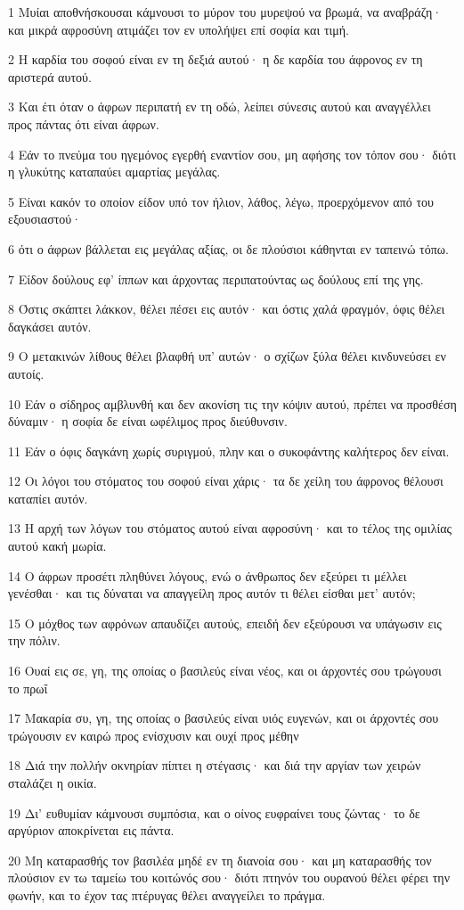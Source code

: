 \par 1 Μυίαι αποθνήσκουσαι κάμνουσι το μύρον του μυρεψού να βρωμά, να αναβράζη· και μικρά αφροσύνη ατιμάζει τον εν υπολήψει επί σοφία και τιμή.
\par 2 Η καρδία του σοφού είναι εν τη δεξιά αυτού· η δε καρδία του άφρονος εν τη αριστερά αυτού.
\par 3 Και έτι όταν ο άφρων περιπατή εν τη οδώ, λείπει σύνεσις αυτού και αναγγέλλει προς πάντας ότι είναι άφρων.
\par 4 Εάν το πνεύμα του ηγεμόνος εγερθή εναντίον σου, μη αφήσης τον τόπον σου· διότι η γλυκύτης καταπαύει αμαρτίας μεγάλας.
\par 5 Είναι κακόν το οποίον είδον υπό τον ήλιον, λάθος, λέγω, προερχόμενον από του εξουσιαστού·
\par 6 ότι ο άφρων βάλλεται εις μεγάλας αξίας, οι δε πλούσιοι κάθηνται εν ταπεινώ τόπω.
\par 7 Είδον δούλους εφ' ίππων και άρχοντας περιπατούντας ως δούλους επί της γης.
\par 8 Όστις σκάπτει λάκκον, θέλει πέσει εις αυτόν· και όστις χαλά φραγμόν, όφις θέλει δαγκάσει αυτόν.
\par 9 Ο μετακινών λίθους θέλει βλαφθή υπ' αυτών· ο σχίζων ξύλα θέλει κινδυνεύσει εν αυτοίς.
\par 10 Εάν ο σίδηρος αμβλυνθή και δεν ακονίση τις την κόψιν αυτού, πρέπει να προσθέση δύναμιν· η σοφία δε είναι ωφέλιμος προς διεύθυνσιν.
\par 11 Εάν ο όφις δαγκάνη χωρίς συριγμού, πλην και ο συκοφάντης καλήτερος δεν είναι.
\par 12 Οι λόγοι του στόματος του σοφού είναι χάρις· τα δε χείλη του άφρονος θέλουσι καταπίει αυτόν.
\par 13 Η αρχή των λόγων του στόματος αυτού είναι αφροσύνη· και το τέλος της ομιλίας αυτού κακή μωρία.
\par 14 Ο άφρων προσέτι πληθύνει λόγους, ενώ ο άνθρωπος δεν εξεύρει τι μέλλει γενέσθαι· και τις δύναται να απαγγείλη προς αυτόν τι θέλει είσθαι μετ' αυτόν;
\par 15 Ο μόχθος των αφρόνων απαυδίζει αυτούς, επειδή δεν εξεύρουσι να υπάγωσιν εις την πόλιν.
\par 16 Ουαί εις σε, γη, της οποίας ο βασιλεύς είναι νέος, και οι άρχοντές σου τρώγουσι το πρωΐ
\par 17 Μακαρία συ, γη, της οποίας ο βασιλεύς είναι υιός ευγενών, και οι άρχοντές σου τρώγουσιν εν καιρώ προς ενίσχυσιν και ουχί προς μέθην
\par 18 Διά την πολλήν οκνηρίαν πίπτει η στέγασις· και διά την αργίαν των χειρών σταλάζει η οικία.
\par 19 Δι' ευθυμίαν κάμνουσι συμπόσια, και ο οίνος ευφραίνει τους ζώντας· το δε αργύριον αποκρίνεται εις πάντα.
\par 20 Μη καταρασθής τον βασιλέα μηδέ εν τη διανοία σου· και μη καταρασθής τον πλούσιον εν τω ταμείω του κοιτώνός σου· διότι πτηνόν του ουρανού θέλει φέρει την φωνήν, και το έχον τας πτέρυγας θέλει αναγγείλει το πράγμα.


